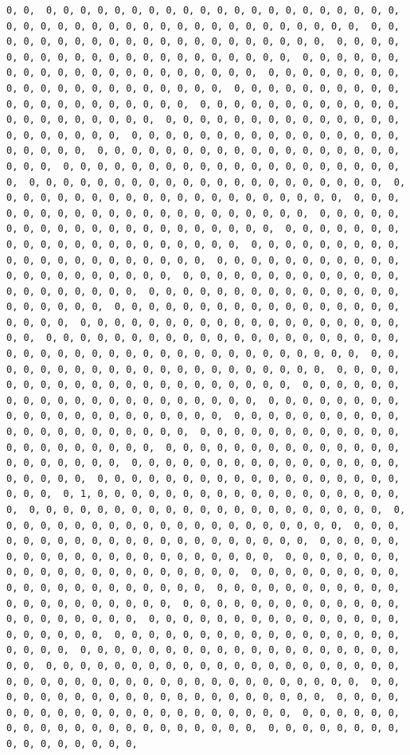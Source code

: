 \documentclass[
]{article}
\begin{document}
\begin{verbatim}
0, 0,  0, 0, 0, 0, 0, 0, 0, 0, 0, 0, 0, 0, 0, 0, 0, 0, 0, 0, 0, 0, 0,  0, 0, 0, 0, 0, 0, 0, 0, 0, 0, 0, 0, 0, 0, 0, 0, 0, 0, 0, 0, 0,  0, 0, 0, 0, 0, 0, 0, 0, 0, 0, 0, 0, 0, 0, 0, 0, 0, 0, 0, 0, 0,  0, 0, 0, 0, 0, 0, 0, 0, 0, 0, 0, 0, 0, 0, 0, 0, 0, 0, 0, 0, 0,  0, 0, 0, 0, 0, 0, 0, 0, 0, 0, 0, 0, 0, 0, 0, 0, 0, 0, 0, 0, 0,  0, 0, 0, 0, 0, 0, 0, 0, 0, 0, 0, 0, 0, 0, 0, 0, 0, 0, 0, 0, 0,  0, 0, 0, 0, 0, 0, 0, 0, 0, 0, 0, 0, 0, 0, 0, 0, 0, 0, 0, 0, 0,  0, 0, 0, 0, 0, 0, 0, 0, 0, 0, 0, 0, 0, 0, 0, 0, 0, 0, 0, 0, 0,  0, 0, 0, 0, 0, 0, 0, 0, 0, 0, 0, 0, 0, 0, 0, 0, 0, 0, 0, 0, 0,  0, 0, 0, 0, 0, 0, 0, 0, 0, 0, 0, 0, 0, 0, 0, 0, 0, 0, 0, 0, 0,  0, 0, 0, 0, 0, 0, 0, 0, 0, 0, 0, 0, 0, 0, 0, 0, 0, 0, 0, 0, 0,  0, 0, 0, 0, 0, 0, 0, 0, 0, 0, 0, 0, 0, 0, 0, 0, 0, 0, 0, 0, 0,  0, 0, 0, 0, 0, 0, 0, 0, 0, 0, 0, 0, 0, 0, 0, 0, 0, 0, 0, 0, 0,  0, 0, 0, 0, 0, 0, 0, 0, 0, 0, 0, 0, 0, 0, 0, 0, 0, 0, 0, 0, 0,  0, 0, 0, 0, 0, 0, 0, 0, 0, 0, 0, 0, 0, 0, 0, 0, 0, 0, 0, 0, 0,  0, 0, 0, 0, 0, 0, 0, 0, 0, 0, 0, 0, 0, 0, 0, 0, 0, 0, 0, 0, 0,  0, 0, 0, 0, 0, 0, 0, 0, 0, 0, 0, 0, 0, 0, 0, 0, 0, 0, 0, 0, 0,  0, 0, 0, 0, 0, 0, 0, 0, 0, 0, 0, 0, 0, 0, 0, 0, 0, 0, 0, 0, 0,  0, 0, 0, 0, 0, 0, 0, 0, 0, 0, 0, 0, 0, 0, 0, 0, 0, 0, 0, 0, 0,  0, 0, 0, 0, 0, 0, 0, 0, 0, 0, 0, 0, 0, 0, 0, 0, 0, 0, 0, 0, 0,  0, 0, 0, 0, 0, 0, 0, 0, 0, 0, 0, 0, 0, 0, 0, 0, 0, 0, 0, 0, 0,  0, 0, 0, 0, 0, 0, 0, 0, 0, 0, 0, 0, 0, 0, 0, 0, 0, 0, 0, 0, 0,  0, 0, 0, 0, 0, 0, 0, 0, 0, 0, 0, 0, 0, 0, 0, 0, 0, 0, 0, 0, 0,  0, 0, 0, 0, 0, 0, 0, 0, 0, 0, 0, 0, 0, 0, 0, 0, 0, 0, 0, 0, 0,  0, 0, 0, 0, 0, 0, 0, 0, 0, 0, 0, 0, 0, 0, 0, 0, 0, 0, 0, 0, 0,  0, 0, 0, 0, 0, 0, 0, 0, 0, 0, 0, 0, 0, 0, 0, 0, 0, 0, 0, 0, 0,  0, 0, 0, 0, 0, 0, 0, 0, 0, 0, 0, 0, 0, 0, 0, 0, 0, 0, 0, 0, 0,  0, 0, 0, 0, 0, 0, 0, 0, 0, 0, 0, 0, 0, 0, 0, 0, 0, 0, 0, 0, 0,  0, 0, 0, 0, 0, 0, 0, 0, 0, 0, 0, 0, 0, 0, 0, 0, 0, 0, 0, 0, 0,  0, 0, 0, 0, 0, 0, 0, 0, 0, 0, 0, 0, 0, 0, 0, 0, 0, 0, 0, 0, 0,  0, 0, 0, 0, 0, 0, 0, 0, 0, 0, 0, 0, 0, 0, 0, 0, 0, 0, 0, 0, 0,  0, 0, 0, 0, 0, 0, 0, 0, 0, 0, 0, 0, 0, 0, 0, 0, 0, 0, 0, 0, 0,  0, 0, 0, 0, 0, 0, 0, 0, 0, 0, 0, 0, 0, 0, 0, 0, 0, 0, 0, 0, 0,  0, 0, 0, 0, 0, 0, 0, 0, 0, 0, 0, 0, 0, 0, 0, 0, 0, 0, 0, 0, 0,  0, 1, 0, 0, 0, 0, 0, 0, 0, 0, 0, 0, 0, 0, 0, 0, 0, 0, 0, 0, 0,  0, 0, 0, 0, 0, 0, 0, 0, 0, 0, 0, 0, 0, 0, 0, 0, 0, 0, 0, 0, 0,  0, 0, 0, 0, 0, 0, 0, 0, 0, 0, 0, 0, 0, 0, 0, 0, 0, 0, 0, 0, 0,  0, 0, 0, 0, 0, 0, 0, 0, 0, 0, 0, 0, 0, 0, 0, 0, 0, 0, 0, 0, 0,  0, 0, 0, 0, 0, 0, 0, 0, 0, 0, 0, 0, 0, 0, 0, 0, 0, 0, 0, 0, 0,  0, 0, 0, 0, 0, 0, 0, 0, 0, 0, 0, 0, 0, 0, 0, 0, 0, 0, 0, 0, 0,  0, 0, 0, 0, 0, 0, 0, 0, 0, 0, 0, 0, 0, 0, 0, 0, 0, 0, 0, 0, 0,  0, 0, 0, 0, 0, 0, 0, 0, 0, 0, 0, 0, 0, 0, 0, 0, 0, 0, 0, 0, 0,  0, 0, 0, 0, 0, 0, 0, 0, 0, 0, 0, 0, 0, 0, 0, 0, 0, 0, 0, 0, 0,  0, 0, 0, 0, 0, 0, 0, 0, 0, 0, 0, 0, 0, 0, 0, 0, 0, 0, 0, 0, 0,  0, 0, 0, 0, 0, 0, 0, 0, 0, 0, 0, 0, 0, 0, 0, 0, 0, 0, 0, 0, 0,  0, 0, 0, 0, 0, 0, 0, 0, 0, 0, 0, 0, 0, 0, 0, 0, 0, 0, 0, 0, 0,  0, 0, 0, 0, 0, 0, 0, 0, 0, 0, 0, 0, 0, 0, 0, 0, 0, 0, 0, 0, 0,  0, 0, 0, 0, 0, 0, 0, 0, 0, 0, 0, 0, 0, 0, 0, 0, 0, 0, 0, 0, 0,  0, 0, 0, 0, 0, 0, 0, 0, 0, 0, 0, 0, 0, 0, 0, 0, 0, 0, 0, 0, 0,  0, 0, 0, 0, 0, 0, 0, 0, 0, 0, 0, 0, 0, 0, 0, 0, 0, 0, 0, 0, 0,  0, 0, 0, 0, 0, 0, 0, 0, 0, 0, 0, 0, 0, 0, 0, 0, 0, 0, 0, 0, 0,  0, 0, 0, 0, 0, 0, 0, 0, 0, 0, 0, 0, 0, 0, 0, 0, 
\end{verbatim}
\end{document}
